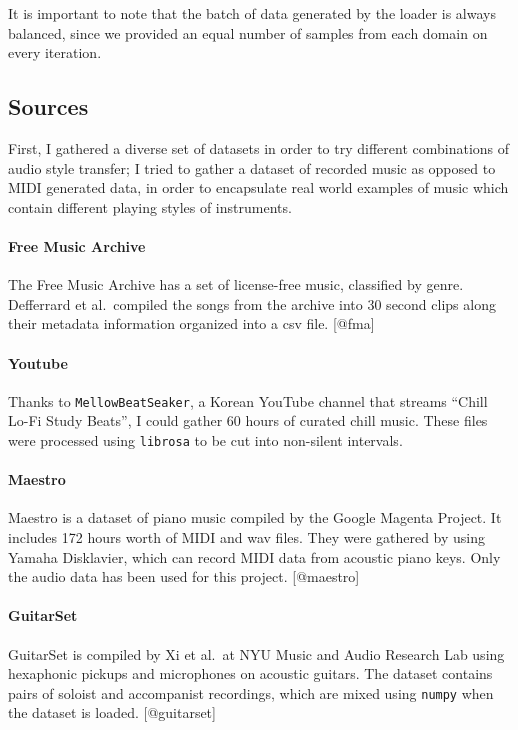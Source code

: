 \documentclass[]{report}
\begin{document}
It is important to note that the batch of data generated by the loader
is always balanced, since we provided an equal number of samples from
each domain on every iteration.

\hypertarget{sources}{%
\subsection{Sources}\label{sources}}

First, I gathered a diverse set of datasets in order to try different
combinations of audio style transfer; I tried to gather a dataset of
recorded music as opposed to MIDI generated data, in order to
encapsulate real world examples of music which contain different playing
styles of instruments.

\paragraph{Free Music Archive}

The Free Music Archive has a set of license-free music, classified by
genre. Defferrard et al.~compiled the songs from the archive into 30
second clips along their metadata information organized into a csv file.
{[}@fma{]}

\paragraph{Youtube}

Thanks to \texttt{MellowBeatSeaker}, a Korean YouTube channel that
streams ``Chill Lo-Fi Study Beats'', I could gather 60 hours of curated
chill music. These files were processed using \texttt{librosa} to be cut
into non-silent intervals.

\paragraph{Maestro}

Maestro is a dataset of piano music compiled by the Google Magenta
Project. It includes 172 hours worth of MIDI and wav files. They were
gathered by using Yamaha Disklavier, which can record MIDI data from
acoustic piano keys. Only the audio data has been used for this project.
{[}@maestro{]}

\paragraph{GuitarSet}

GuitarSet is compiled by Xi et al.~at NYU Music and Audio Research Lab
using hexaphonic pickups and microphones on acoustic guitars. The
dataset contains pairs of soloist and accompanist recordings, which are
mixed using \texttt{numpy} when the dataset is loaded. {[}@guitarset{]}
\end{document}
